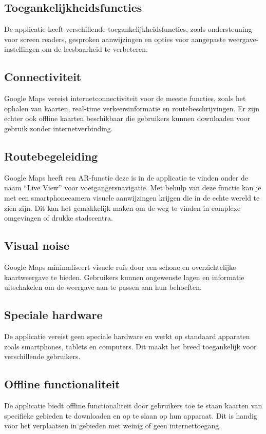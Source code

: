 \subsection*{Toegankelijkheidsfuncties}
De applicatie heeft verschillende toegankelijkheidsfuncties, zoals ondersteuning voor screen readers, gesproken aanwijzingen en opties voor aangepaste weergave-instellingen om de leesbaarheid te verbeteren.

\subsection*{Connectiviteit}
Google Maps vereist internetconnectiviteit voor de meeste functies, zoals het ophalen van kaarten, real-time verkeersinformatie en routebeschrijvingen. Er zijn echter ook offline kaarten beschikbaar die gebruikers kunnen downloaden voor gebruik zonder internetverbinding.

\subsection*{Routebegeleiding}
Google Maps heeft een AR-functie deze is in de applicatie te vinden onder de naam ``Live View'' voor voetgangersnavigatie. Met behulp van deze functie kan je met een smartphonecamera visuele aanwijzingen krijgen die in de echte wereld te zien zijn. Dit kan het gemakkelijk maken om de weg te vinden in complexe omgevingen of drukke stadscentra.

\subsection*{Visual noise}
Google Maps minimaliseert visuele ruis door een schone en overzichtelijke kaartweergave te bieden. Gebruikers kunnen ongewenste lagen en informatie uitschakelen om de weergave aan te passen aan hun behoeften.

\subsection*{Speciale hardware}
De applicatie vereist geen speciale hardware en werkt op standaard apparaten zoals smartphones, tablets en computers. Dit maakt het breed toegankelijk voor verschillende gebruikers.

\subsection*{Offline functionaliteit}
De applicatie biedt offline functionaliteit door gebruikers toe te staan kaarten van specifieke gebieden te downloaden en op te slaan op hun apparaat. Dit is handig voor het verplaatsen in gebieden met weinig of geen internettoegang.

